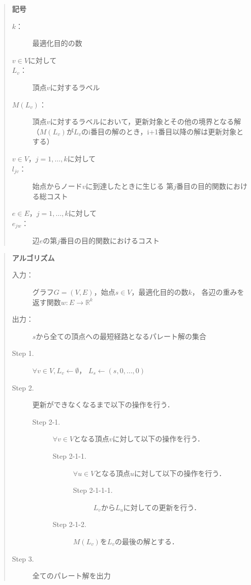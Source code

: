 \documentclass[12pt]{optlab-bachelor}
\begin{document}
\begin{quote}
  \textbf{記号}
  \begin{description}
    \item[$k$：] 最適化目的の数
    \item[$v \in V$に対して]
    \item[$L_v$：] 頂点$v$に対するラベル
    \item[$M(L_v)$：] 頂点$v$に対するラベルにおいて，更新対象とその他の境界となる解
    （$M(L_v)$が$L_v$のi番目の解のとき，i+1番目以降の解は更新対象とする）
    \item[$v \in V$，$j = 1 , \ldots , k$に対して]
    \item[$l_{jv}$：] 始点からノード$v$に到達したときに生じる
    第$j$番目の目的関数における総コスト
    \item[$e \in E$，$j = 1 , \ldots , k$に対して]
    \item[$e_{jw}$：] 辺$e$の第$j$番目の目的関数におけるコスト
  \end{description}
\end{quote}

\begin{quote}
  \textbf{アルゴリズム}
  \begin{description}
    \item[入力：] グラフ$G=(V,E)$，始点$s \in V$，最適化目的の数$k$，
    各辺の重みを返す関数$w : E \to \mathbb{R}^k$
    \item[出力：] $s$から全ての頂点への最短経路となるパレート解の集合
    \item[Step 1.] $\forall v \in V , L_v \leftarrow \emptyset$，
    $L_s \leftarrow (s,0,\ldots,0)$
    \item[Step 2.] 更新ができなくなるまで以下の操作を行う．
    \begin{description}
      \item[Step 2-1.] $\forall v \in V$となる頂点$v$に対して以下の操作を行う．
      \begin{description}
        \item[Step 2-1-1.] $\forall u \in V$となる頂点$u$に対して以下の操作を行う．
        \begin{description}
          \item[Step 2-1-1-1.] $L_v$から$L_u$に対しての更新を行う．
        \end{description}
        \item[Step 2-1-2.] $M(L_v)$を$L_v$の最後の解とする．
      \end{description}
    \end{description}
    \item[Step 3.] 全てのパレート解を出力
  \end{description}
\end{quote}
\end{document}
